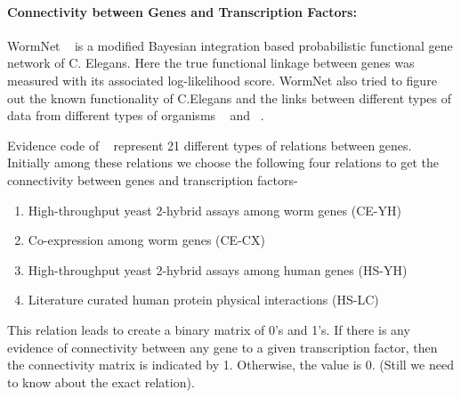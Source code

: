 \documentclass[12pt]{article}
\begin{document}
\paragraph{Connectivity between Genes and Transcription Factors:}
WormNet ~\cite{wormnet:url} is a modified Bayesian integration based probabilistic functional gene network of C. Elegans.
Here the true functional linkage between genes was measured with its associated log-likelihood score.
WormNet also tried to figure out the known functionality of C.Elegans and the links between 
different types of data from different types of organisms ~\cite{wormnet:01} and ~\cite{wormnet:02}.

Evidence code of ~\cite{wormnet:url} represent 21 different types of relations between genes.
Initially among these relations we choose the following four relations to get the connectivity 
between genes and transcription factors-
\begin{enumerate}
	  \item High-throughput yeast 2-hybrid assays among worm genes (CE-YH)
	  \item Co-expression among worm genes (CE-CX)
	  \item High-throughput yeast 2-hybrid assays among human genes (HS-YH) 
	  \item Literature curated human protein physical interactions (HS-LC) 
\end{enumerate}
This relation leads to create a binary matrix of 0's and 1's. If there is any
evidence of connectivity between any gene to a given transcription factor, then the connectivity matrix
is indicated by 1. Otherwise, the value is 0. (Still we need to know about the exact relation). 
\end{document}
